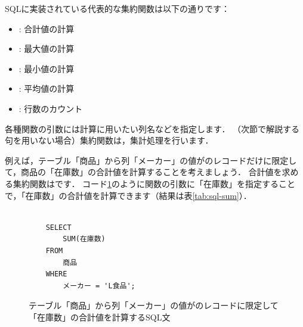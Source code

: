 SQLに実装されている代表的な集約関数は以下の通りです：
\begin{itemize}
\item {}: 合計値の計算
\item {}: 最大値の計算
\item {}: 最小値の計算
\item {}: 平均値の計算
\item {}: 行数のカウント
\end{itemize}
各種関数の引数には計算に用いたい列名などを指定します．
（次節で解説する句を用いない場合）集約関数は，集計処理を行います．

例えば，テーブル「商品」から列「メーカー」の値がのレコードだけに限定して，商品の「在庫数」の合計値を計算することを考えましょう．
合計値を求める集約関数はです．
コード\ref{code:sql-sum}のように関数の引数に「在庫数」を指定することで，「在庫数」の合計値を計算できます（結果は表\ref{tab:sql-sum}）．
\begin{figure}[!htbp]
    \begin{verbatim}

    SELECT
        SUM(在庫数)
    FROM
        商品
    WHERE
        メーカー = 'L食品';

    \end{verbatim}
    \captionsetup{name=コード}
    \caption{テーブル「商品」から列「メーカー」の値がのレコードに限定して「在庫数」の合計値を計算するSQL文}
    \label{code:sql-sum}
\end{figure}
\begin{table}[!htbp]
    \centering
    \caption{テーブル「商品」から列「メーカー」の値がのレコードに限定して「在庫数」の合計値を計算した結果}
    \label{tab:sql-sum}
\end{table}

